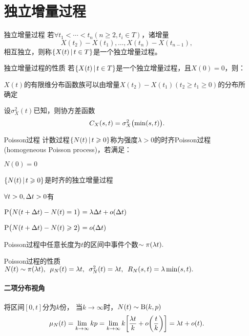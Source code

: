 \section{独立增量过程}
\begin{definition}{独立增量过程}{}
	若$\forall t_1<\cdots<t_n(n\geqslant2, t_i\in T)$，诸增量
	\[
		X(t_2)-X(t_1),\ldots,X(t_n)-X(t_{n-1}),
	\]
	相互独立，则称$\left\{X(t)\,\middle\vert\,t\in T\right\}$是一个独立增量过程。
\end{definition}
\begin{theorem}{独立增量过程的性质}{}
	若$\left\{X(t)\,\middle\vert\,t\in T\right\}$是一个独立增量过程，且$X(0)=0$，则：
	\begin{compactitem}
		\item $X(t)$的有限维分布函数族可以由增量$X(t_2)-X(t_1)(t_2\geqslant t_1\geqslant 0)$的分布所确定
		\item 设$\sigma^2_X(t)$已知，则协方差函数
		\begin{align}
			C_X(s,t)=\sigma^2_X\bigl(\min(s,t)\bigr).
		\end{align}
	\end{compactitem}
\end{theorem}
\begin{definition}{Poisson过程}{}
	计数过程$\left\{N(t)\,\middle\vert\,t\geqslant 0\right\}$称为强度$\lambda>0$的时齐Poisson过程(homogeneous Poisson process)，若满足：
	\begin{compactenum}
		\item $N(0)=0$
		\item $\left\{N(t)\,\middle\vert\,t\geqslant 0\right\}$是时齐的独立增量过程
		\item $\forall t>0,\Delta t>0$有
		\begin{compactitem}
			\item $\operatorname{P}\bigl(N(t+\Delta t)-N(t)=1\bigr)=\lambda\Delta t+o(\Delta t)$
			\item $\operatorname{P}\bigl(N(t+\Delta t)-N(t)\geqslant 2\bigr)=o(\Delta t)$
		\end{compactitem}
	\end{compactenum}
\end{definition}
Poisson过程中任意长度为$ t $的区间中事件个数$\sim\operatorname{\pi}(\lambda t).$
\begin{theorem}{Poisson过程的性质}{}
	$N(t)\sim\operatorname{\pi}(\lambda t),\enspace\mu_N(t)=\lambda t,\enspace\sigma^2_N(t)=\lambda t,\enspace R_N(s,t)=\lambda\min(s,t).$%
\end{theorem}
\paragraph{二项分布视角}
将区间$ [0, t] $分为$ k $份，
当$k\to\infty$时，$N(t)\sim\operatorname{B}(k,p)$
\[
	\mu_N(t)=\lim_{k\to\infty}kp=\lim_{k\to\infty}k\biggl[\frac{\lambda t}k+o\biggl(\frac tk\biggr)\biggr]=\lambda t+o(t).
\]
